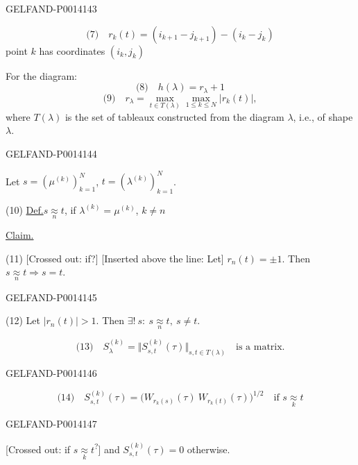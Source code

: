 \begin{GelfandAdjacentEvidence}{GELFAND-P001414}{3}


\[
\text{(7)}\quad r_k(t)=(i_{k+1}-j_{k+1})-(i_k-j_k)
\]
point \(k\) has coordinates \((i_k,j_k)\)

For the diagram:
\[
\text{(8)}\quad h(\lambda)=r_\lambda+1
\]
\[
\text{(9)}\quad r_\lambda=\max_{t\in T(\lambda)}\max_{1\leq k\leq N}|r_k(t)|,
\]
where \(T(\lambda)\) is the set of tableaux constructed from the diagram \(\lambda\), i.e., of shape \(\lambda\).
\end{GelfandAdjacentEvidence}
\begin{GelfandAdjacentEvidence}{GELFAND-P001414}{4}


Let \(s=(\mu^{(k)})_{k=1}^{N}\), \quad \(t=(\lambda^{(k)})_{k=1}^{N}\).

(10) \uline{Def.}\quad \(s\underset{n}{\approx}t\), if
\(\lambda^{(k)}=\mu^{(k)}\), \(k\ne n\)

\uline{Claim.}

(11) [Crossed out: if?] [Inserted above the line: Let] \(r_n(t)=\pm1\).
Then \(s\underset{n}{\approx}t\Rightarrow s=t\).
\end{GelfandAdjacentEvidence}
\begin{GelfandAdjacentEvidence}{GELFAND-P001414}{5}


(12) Let \(|r_n(t)|>1\). Then
\(\exists!\ s:\ s\underset{n}{\approx}t,\ s\ne t\).

\[
\text{(13)}\quad S_\lambda^{(k)}=\Vert S_{s,t}^{(k)}(\tau)\Vert_{s,t\in T(\lambda)}
\quad\text{is a matrix.}
\]
\end{GelfandAdjacentEvidence}
\begin{GelfandAdjacentEvidence}{GELFAND-P001414}{6}


\[
\text{(14)}\quad
S_{s,t}^{(k)}(\tau)=\bigl(W_{r_k(s)}(\tau)\ W_{r_k(t)}(\tau)\bigr)^{1/2}
\quad\text{if }s\underset{k}{\approx}t
\]
\end{GelfandAdjacentEvidence}
\begin{GelfandAdjacentEvidence}{GELFAND-P001414}{7}


[Crossed out: if \(s\underset{k}{\approx}t\)\textsuperscript{?}]
and \(S_{s,t}^{(k)}(\tau)=0\) otherwise.
\end{GelfandAdjacentEvidence}



